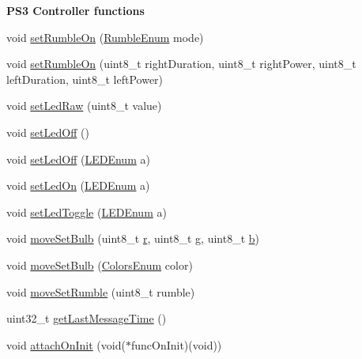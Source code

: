 \begin{Indent}{\bf \-P\-S3 \-Controller functions}
\begin{DoxyCompactItemize}
\item 
void \hyperlink{class_p_s3_b_t_a7a3e593911490538c061e9ccb4273f87}{set\-Rumble\-On} (\hyperlink{controller_enums_8h_ab195293384292950ebc2166bfe360fd1}{\-Rumble\-Enum} mode)
\item 
void \hyperlink{class_p_s3_b_t_ae309556e995afc10b13dfbe4e6c32798}{set\-Rumble\-On} (uint8\-\_\-t right\-Duration, uint8\-\_\-t right\-Power, uint8\-\_\-t left\-Duration, uint8\-\_\-t left\-Power)
\item 
void \hyperlink{class_p_s3_b_t_a0acdc09661a8099b2d5e8b59cd8325bb}{set\-Led\-Raw} (uint8\-\_\-t value)
\item 
void \hyperlink{class_p_s3_b_t_a2ce9fb6251b56ec877cd22af7213a037}{set\-Led\-Off} ()
\item 
void \hyperlink{class_p_s3_b_t_af8677eaae9121a60947a1743628cd20a}{set\-Led\-Off} (\hyperlink{controller_enums_8h_a70df64e026046bc352983127b7ae2cf0}{\-L\-E\-D\-Enum} a)
\item 
void \hyperlink{class_p_s3_b_t_a4e6cdea1880421a21cc8cfca0f00b449}{set\-Led\-On} (\hyperlink{controller_enums_8h_a70df64e026046bc352983127b7ae2cf0}{\-L\-E\-D\-Enum} a)
\item 
void \hyperlink{class_p_s3_b_t_ae163b7f00d287f8647dabc2897d0d208}{set\-Led\-Toggle} (\hyperlink{controller_enums_8h_a70df64e026046bc352983127b7ae2cf0}{\-L\-E\-D\-Enum} a)
\item 
void \hyperlink{class_p_s3_b_t_ad0926b75edcbb12ddf76f78e66728782}{move\-Set\-Bulb} (uint8\-\_\-t \hyperlink{_p_s4_parser_8h_a4c5c6ceb8ed33456261fa907136e0c3a}{r}, uint8\-\_\-t \hyperlink{_p_s4_parser_8h_a1673907d4d89d763bb7b94ec1eeb7b60}{g}, uint8\-\_\-t \hyperlink{_p_s4_parser_8h_a4313c9563516f94387762ab05763456b}{b})
\item 
void \hyperlink{class_p_s3_b_t_abe1292b459edfd114ef129b3320d5317}{move\-Set\-Bulb} (\hyperlink{controller_enums_8h_aac6fa7b0395b95cc528deaad0ce884a2}{\-Colors\-Enum} color)
\item 
void \hyperlink{class_p_s3_b_t_ac14d338ddb573d1c06f70749f9205689}{move\-Set\-Rumble} (uint8\-\_\-t rumble)
\item 
uint32\-\_\-t \hyperlink{class_p_s3_b_t_ad5b6bba68b85614f6a1b2ddeb2a3f191}{get\-Last\-Message\-Time} ()
\item 
void \hyperlink{class_p_s3_b_t_a11a7a031b249e09c39aa0872fa1e4a6c}{attach\-On\-Init} (void($\ast$func\-On\-Init)(void))
\end{DoxyCompactItemize}
\end{Indent}
